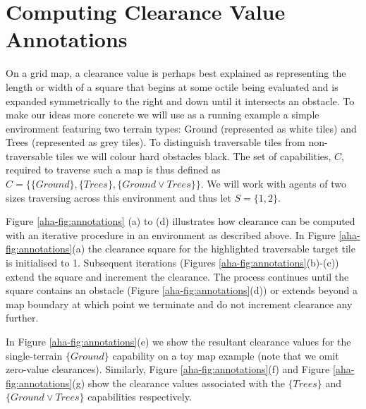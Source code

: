 \section{Computing Clearance Value Annotations}
\label{aha:planningwithannotations}
On a grid map, a clearance value is perhaps best explained as representing the length or width of a square that begins at some octile being evaluated and is expanded symmetrically to the right and down until it intersects an obstacle.     
To make our ideas more concrete we will use as a running example a simple environment featuring two terrain types: Ground (represented as white tiles) and Trees (represented as grey tiles). 
To distinguish traversable tiles from non-traversable tiles we will colour hard obstacles black. 
The set of capabilities, $C$, required to traverse such a map is thus defined as $C = \lbrace \lbrace Ground \rbrace, \lbrace Trees \rbrace, \lbrace Ground \vee Trees \rbrace \rbrace$. 
We will work with agents of two sizes traversing across this environment and thus let $S = \lbrace 1, 2 \rbrace$.
\par \indent
Figure \ref{aha-fig:annotations} (a) to (d) illustrates how clearance can be computed with an iterative procedure in an environment as described above.
In Figure \ref{aha-fig:annotations}(a) the clearance square for the highlighted traversable target tile is initialised to 1. 
Subsequent iterations (Figures \ref{aha-fig:annotations}(b)-(c)) extend the square and increment the clearance. 
The process continues until the square contains an obstacle (Figure \ref{aha-fig:annotations}(d)) or extends beyond a map boundary at which point we terminate and do not increment clearance any further.
\par \indent
In Figure \ref{aha-fig:annotations}(e) we show the resultant clearance values for the single-terrain $\lbrace Ground \rbrace$ capability on a toy map example (note that we omit zero-value clearances).
Similarly, Figure \ref{aha-fig:annotations}(f) and Figure \ref{aha-fig:annotations}(g) show the clearance values associated with the $\lbrace Trees \rbrace$ and $\lbrace Ground \vee Trees \rbrace$ capabilities respectively.  

